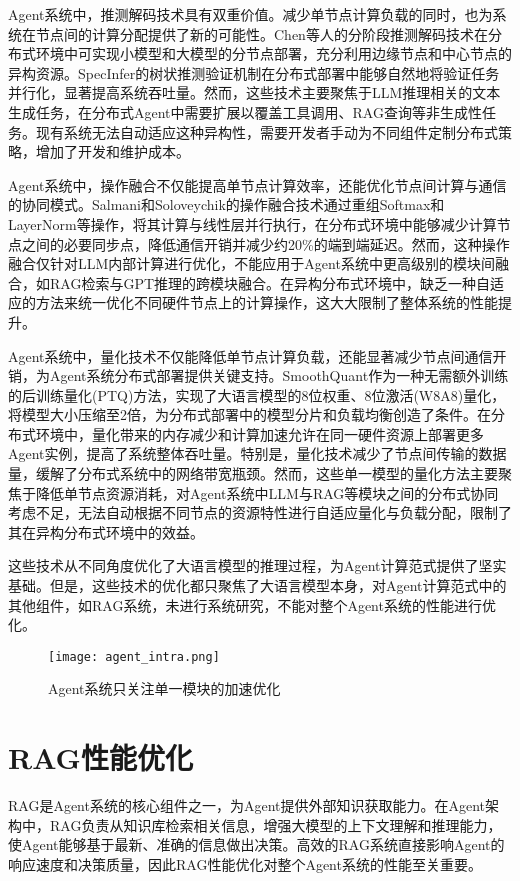 Agent系统中，推测解码技术具有双重价值。减少单节点计算负载的同时，也为系统在节点间的计算分配提供了新的可能性。Chen等人的分阶段推测解码\cite{chen2023acceleratinglargelanguagemodel}技术在分布式环境中可实现小模型和大模型的分节点部署，充分利用边缘节点和中心节点的异构资源。SpecInfer\cite{10.1145/3620666.3651335}的树状推测验证机制在分布式部署中能够自然地将验证任务并行化，显著提高系统吞吐量。然而，这些技术主要聚焦于LLM推理相关的文本生成任务，在分布式Agent中需要扩展以覆盖工具调用、RAG查询等非生成性任务。现有系统无法自动适应这种异构性，需要开发者手动为不同组件定制分布式策略，增加了开发和维护成本。

Agent系统中，操作融合不仅能提高单节点计算效率，还能优化节点间计算与通信的协同模式。Salmani和Soloveychik的操作融合技术\cite{salmani2025llminferenceaccelerationefficient}通过重组Softmax和LayerNorm等操作，将其计算与线性层并行执行，在分布式环境中能够减少计算节点之间的必要同步点，降低通信开销并减少约20\%的端到端延迟。然而，这种操作融合仅针对LLM内部计算进行优化，不能应用于Agent系统中更高级别的模块间融合，如RAG检索与GPT推理的跨模块融合。在异构分布式环境中，缺乏一种自适应的方法来统一优化不同硬件节点上的计算操作，这大大限制了整体系统的性能提升。

Agent系统中，量化技术不仅能降低单节点计算负载，还能显著减少节点间通信开销，为Agent系统分布式部署提供关键支持。SmoothQuant\cite{pmlr-v202-xiao23c}作为一种无需额外训练的后训练量化(PTQ)方法，实现了大语言模型的8位权重、8位激活(W8A8)量化，将模型大小压缩至2倍，为分布式部署中的模型分片和负载均衡创造了条件。在分布式环境中，量化带来的内存减少和计算加速允许在同一硬件资源上部署更多Agent实例，提高了系统整体吞吐量。特别是，量化技术减少了节点间传输的数据量，缓解了分布式系统中的网络带宽瓶颈。然而，这些单一模型的量化方法主要聚焦于降低单节点资源消耗，对Agent系统中LLM与RAG等模块之间的分布式协同考虑不足，无法自动根据不同节点的资源特性进行自适应量化与负载分配，限制了其在异构分布式环境中的效益。

这些技术从不同角度优化了大语言模型的推理过程，为Agent计算范式提供了坚实基础。但是，这些技术的优化都只聚焦了大语言模型本身，对Agent计算范式中的其他组件，如RAG系统，未进行系统研究，不能对整个Agent系统的性能进行优化。

\begin{figure}[h]
    \centering
    \texttt{[image: agent\_intra.png]}
    \caption{Agent系统只关注单一模块的加速优化}
    \label{fig:accelerate_monolith}
\end{figure}

\section{RAG性能优化}
RAG是Agent系统的核心组件之一，为Agent提供外部知识获取能力。在Agent架构中，RAG负责从知识库检索相关信息，增强大模型的上下文理解和推理能力，使Agent能够基于最新、准确的信息做出决策。高效的RAG系统直接影响Agent的响应速度和决策质量，因此RAG性能优化对整个Agent系统的性能至关重要。


